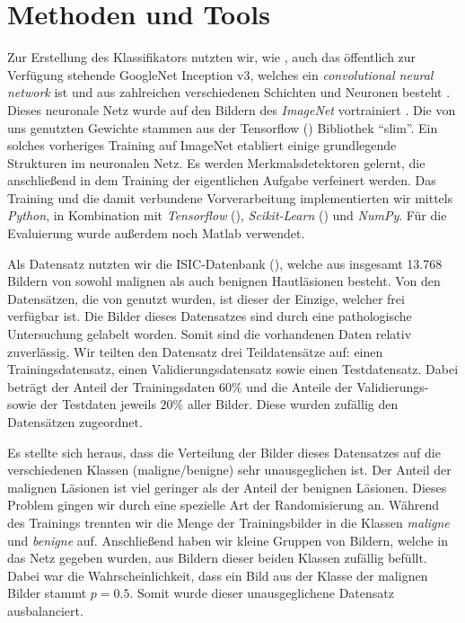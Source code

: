 \section{Methoden und Tools}

Zur Erstellung des Klassifikators nutzten wir, wie \citet{esteva2017dermatologist}, auch das öffentlich zur Verfügung stehende GoogleNet Inception v3, welches ein \textit{convolutional neural network} ist und aus zahlreichen verschiedenen Schichten und Neuronen besteht \citep{szegedy2016rethinking}. Dieses neuronale Netz wurde auf den Bildern des \textit{ImageNet} vortrainiert \citep{russakovsky2015imagenet}. Die von uns genutzten Gewichte stammen aus der Tensorflow (\cite{tensorflow2015-whitepaper}) Bibliothek ``slim''.
Ein solches vorheriges Training auf ImageNet etabliert einige grundlegende Strukturen im neuronalen Netz. Es werden Merkmalsdetektoren gelernt, die anschließend in dem Training der eigentlichen Aufgabe verfeinert werden.  Das Training und die damit verbundene Vorverarbeitung implementierten wir mittels \textit{Python}, in Kombination mit \textit{Tensorflow} (\cite{tensorflow2015-whitepaper}), \textit{Scikit-Learn} (\cite{scikit-learn}) und \textit{NumPy}. Für die Evaluierung wurde außerdem noch Matlab verwendet.

Als Datensatz nutzten wir die ISIC-Datenbank (\cite{ISIC}), welche aus insgesamt 13.768 Bildern von sowohl malignen als auch benignen Hautläsionen besteht. Von den Datensätzen, die von \citet{esteva2017dermatologist} genutzt wurden, ist dieser der Einzige, welcher frei verfügbar ist. Die Bilder dieses Datensatzes sind durch eine pathologische Untersuchung gelabelt worden. Somit sind die vorhandenen Daten relativ zuverlässig. Wir teilten den Datensatz drei Teildatensätze auf: einen Trainingsdatensatz, einen Validierungsdatensatz sowie einen Testdatensatz. Dabei beträgt der Anteil der Trainingsdaten $60\%$ und die Anteile der Validierungs- sowie der Testdaten jeweils $20\%$ aller Bilder. Diese wurden zufällig den Datensätzen zugeordnet.

Es stellte sich heraus, dass die Verteilung der Bilder dieses Datensatzes auf die verschiedenen Klassen (maligne/benigne) sehr unausgeglichen ist. Der Anteil der malignen Läsionen ist viel geringer als der Anteil der benignen Läsionen. Dieses Problem gingen wir durch eine spezielle Art der Randomisierung an. Während des Trainings trennten wir die Menge der Trainingsbilder in die Klassen \textit{maligne} und \textit{benigne} auf. Anschließend haben wir kleine Gruppen von Bildern, welche in das Netz gegeben wurden, aus Bildern dieser beiden Klassen zufällig befüllt. Dabei war die Wahrscheinlichkeit, dass ein Bild aus der Klasse der malignen Bilder stammt $p=0.5$. Somit wurde dieser unausgeglichene Datensatz ausbalanciert.

